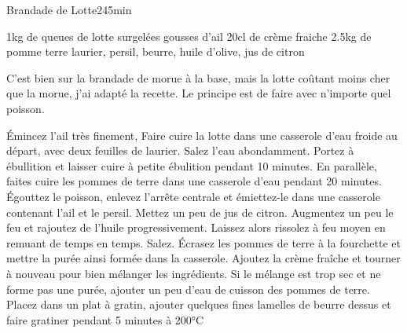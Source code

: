 \begin{recette}{Brandade de Lotte}{2}{45min}{}
\begin{ingredients}
\ingredient 1kg de queues de lotte surgelées
 gousses d'ail
\ingredient 20cl de crème fraiche
\ingredient 2.5kg de pomme terre
\ingredient laurier, persil, beurre, huile d'olive, jus de citron
\end{ingredients}

\begin{remarque}
C'est bien sur la brandade de morue à la base, mais la lotte coûtant moins cher que la morue, j'ai adapté la recette. Le principe est de faire avec n'importe quel poisson.
\end{remarque}


\begin{preparation}
\etape Émincez l'ail très finement, 
\etape Faire cuire la lotte dans une casserole d'eau froide au départ, avec deux feuilles de laurier. Salez l'eau abondamment. Portez à ébullition et laisser cuire à petite ébulition pendant 10 minutes.
\etape En parallèle, faites cuire les pommes de terre dans une casserole d'eau pendant 20 minutes.
\etape Égouttez le poisson, enlevez l'arrête centrale et émiettez-le dans une casserole contenant l'ail et le persil. Mettez un peu de jus de citron. Augmentez un peu le feu et rajoutez de l'huile progressivement. Laissez alors rissolez à feu moyen en remuant de temps en temps. Salez.
\etape Écrasez les pommes de terre à la fourchette et mettre la purée ainsi formée dans la casserole.
\etape Ajoutez la crème fraîche et tourner à nouveau pour bien mélanger les ingrédients. Si le mélange est trop sec et ne forme pas une purée, ajouter un peu d'eau de cuisson des pommes de terre.
\etape Placez dans un plat à gratin, ajouter quelques fines lamelles de beurre dessus et faire gratiner pendant 5 minutes à 200°C
\end{preparation}

\end{recette}

